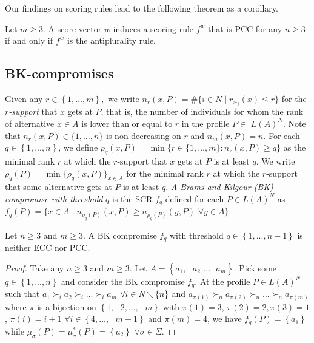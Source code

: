 \documentclass[version=3.21, pagesize, twoside=off, bibliography=totoc, DIV=calc, fontsize=12pt, a4paper]{scrartcl}
\begin{document}
Our findings on scoring rules lead to the following theorem as a corollary.

\begin{theorem}
Let $m\geq 3.$ A score vector $w$ induces a scoring rule $f^w$ that is
PCC for any $n\geq 3$ if and only if $f^w$ is the antiplurality rule.
\end{theorem}

\subsection{BK-compromises}
\label{sec:BKn3}
Given any $r\in \left\{ 1,\ldots ,m\right\} ,$ we write $n_{r}(x,P)=\#\{i\in
N\mid r_{\succ _{i}}(x)\leq r\}$ for the \emph{$r$-support} that $x$ gets at $P$, that is, the number of individuals for whom the rank of alternative $x\in A$ is lower than or equal to $r$ in the profile $P\in $ $L(A)^{N}$.
Note that $n_{r}(x,P)\in \{1,\ldots ,n\}$ is non-decreasing on $r$ and $%
n_{m}(x,P)=n.$ For each $q\in \left\{ 1,...,n\right\} $, we define $\rho
_{q}(x,P)=\min \{r\in \{1,\ldots ,m\}:n_{r}(x,P)\geq q\}$ as the minimal
rank $r$ at which the $r$-support that $x$ gets at $P$ is at least $q$. We
write $\rho _{q}(P)=\min \{\rho _{q}(x,P)\}_{x\in A}$ for the minimal rank $%
r $ at which the $r$-support that some alternative gets at $P$ is at least $q
$. \textit{A Brams and Kilgour (BK) compromise with threshold }$q$ is the
SCR $f_{q}$ defined for each $P\in L(A)^{N}$ as $f_{q}(P)=\{x\in A\mid
n_{\rho _{q}(P)}(x,P)\geq n_{\rho _{q}(P)}(y,P)$ $\forall y\in A\}.$

\begin{theorem}
	\label{th:BKthreshold}
Let $n\geq 3$ and $m\geq 3.$ A BK compromise $f_{q}$ with threshold $q\in
\left\{ 1,...,n-1\right\} $ is neither ECC nor PCC.
\end{theorem}

\begin{proof}
Take any $n\geq 3$ and $m\geq 3.$ Let $A=\left\{ a_{1},\text{ }a_{2,}...%
\text{ }a_{m}\right\} $. Pick some $q\in \left\{ 1,...,n\right\} $ and
consider the BK compromise $f_{q}$. At the profile $P\in L(A)^{N}$ such that 
$a_{1}\succ _{i}a_{2}\succ _{i}...\succ _{i}a_{m}$ $\forall i\in N\diagdown
\left\{ n\right\} $ and $a_{\pi (1)}\succ _{n}a_{\pi (2)}\succ _{n}...\succ
_{n}a_{\pi (m)}$ where $\pi $ is a bijection on $\left\{ 1,\text{ }2,...,%
\text{ }m\right\} $ with $\pi (1)=3$, $\pi (2)=2,\pi (3)=1$, $\pi (i)=i+1$ $%
\forall i\in \left\{ 4,...,\text{ }m-1\right\} $ and $\pi (m)=4 $,  we have $%
f_{q}(P)=\left\{ a_{1}\right\} $ while $\mu _{\sigma }(P)=\mu _{\sigma
}^{\ast }(P)=\left\{ a_{2}\right\} $ $\forall \sigma \in \Sigma $.
\end{proof}
\end{document}
